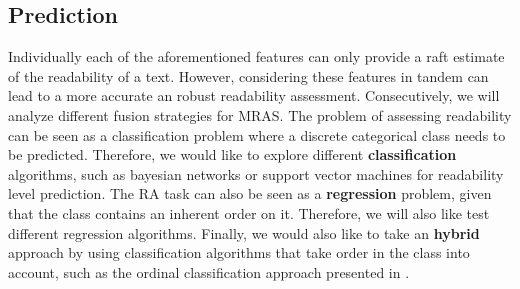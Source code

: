 \documentclass[12pt]{article}
\begin{document}



\subsection{Prediction}

Individually each of the aforementioned features can only provide a raft estimate of the readability of a text. However, considering these features in tandem can lead to a more accurate an robust readability assessment. Consecutively, we will analyze different fusion strategies for MRAS. The problem of assessing readability can be seen as a classification problem where a discrete categorical class needs to be predicted. Therefore, we would like to  explore different \textbf{classification} algorithms, such as bayesian networks or support vector machines \cite{cortes1995support} for readability level prediction.  The RA task can also be seen as a \textbf{regression} problem, given that the class contains an inherent order on it. Therefore, we will also like test different regression algorithms. Finally, we would also like to take an \textbf{hybrid} approach by using classification algorithms that take order in the class into account, such as the ordinal classification approach presented in \cite{frank2001simple}.
\end{document}
